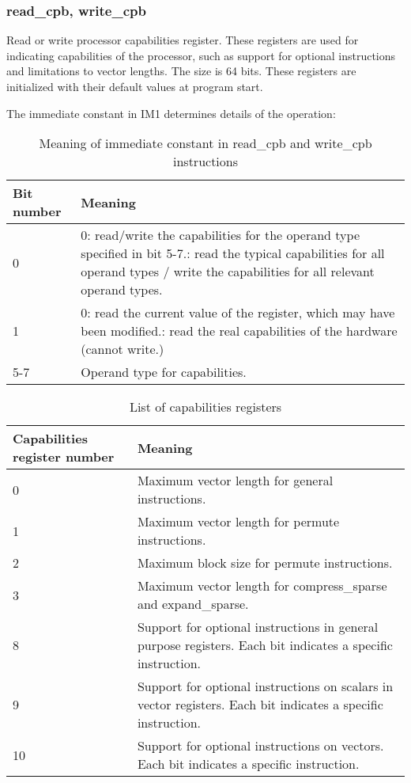 \documentclass[forwardcom.tex]{subfiles}
\begin{document}
\subsubsection{read\_cpb, write\_cpb}
Read or write processor capabilities register. These registers are used for indicating capabilities of the processor, such as support for optional instructions and limitations to vector lengths. The size is 64 bits. These registers are initialized with their default values at program start.
\vspace{2mm}

The immediate constant in IM1 determines details of the operation:

\begin{longtable} {|p{20mm}|p{90mm}|}
\caption{Meaning of immediate constant in read\_cpb and write\_cpb instructions} 
\label{table:readWriteCpbModes} \\
\endfirsthead
\endhead
\hline
\bfseries Bit number & \bfseries Meaning  \\
\hline
0  &  0: read/write the capabilities for the operand type specified in bit 5-7.\newline
      1: read the typical capabilities for all operand types / write the capabilities for all    
      relevant operand types.  \\
\hline
1  &  0: read the current value of the register, which may have been modified.\newline
      1: read the real capabilities of the hardware (cannot write.) \\
\hline
5-7 & Operand type for capabilities. \\
\hline
\end{longtable}


\begin{longtable} {|p{20mm}|p{90mm}|}
\caption{List of capabilities registers} 
\label{table:capabilitiesRegisters} \\
\endfirsthead
\endhead
\hline
\bfseries Capabilities register number & \bfseries Meaning  \\
\hline
0  &  Maximum vector length for general instructions. \\
\hline
1  &  Maximum vector length for permute instructions. \\
\hline
2  &  Maximum block size for permute instructions. \\
\hline
3  &  Maximum vector length for compress\_sparse and expand\_sparse. \\
\hline
8  &  Support for optional instructions in general purpose registers. Each bit indicates a specific instruction. \\
\hline
9  &  Support for optional instructions on scalars in vector registers. Each bit indicates a specific instruction. \\
\hline
10 &  Support for optional instructions on vectors. Each bit indicates a specific instruction. \\
\hline
\end{longtable}
\end{document}
